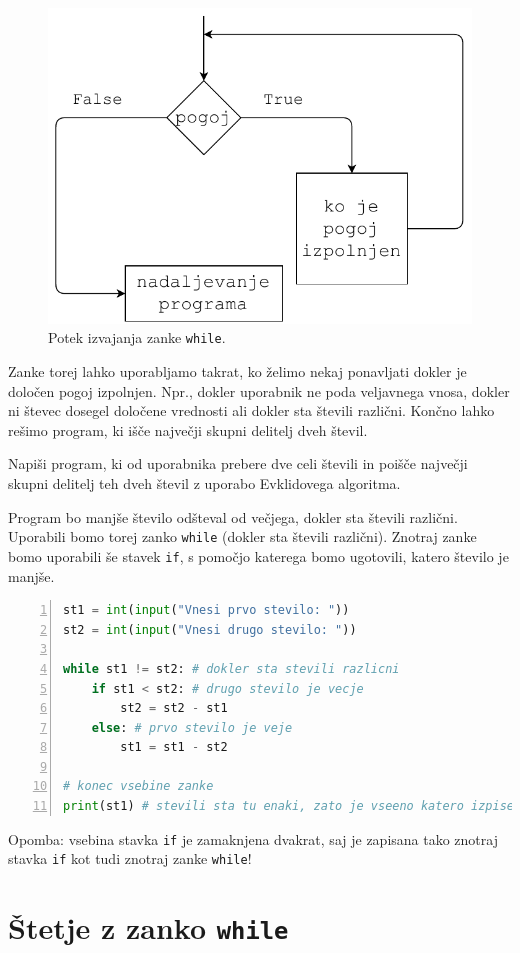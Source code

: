 \begin{figure}
    \centering
    \includegraphics[width=0.5\linewidth]{img/while1.pdf}
    \caption{Potek izvajanja zanke \texttt{while}.}
    \label{img:while1}
\end{figure}

Zanke torej lahko uporabljamo takrat, ko želimo nekaj ponavljati dokler je določen pogoj izpolnjen. Npr., dokler uporabnik ne poda veljavnega vnosa, dokler ni števec dosegel določene vrednosti ali dokler sta števili različni. Končno lahko rešimo program, ki išče največji skupni delitelj dveh števil.
\begin{zgled}
Napiši program, ki od uporabnika prebere dve celi števili in poišče največji skupni delitelj teh dveh števil z uporabo Evklidovega algoritma.
\end{zgled}
\begin{resitev}
Program bo manjše število odšteval od večjega, dokler sta števili različni. Uporabili bomo torej zanko \texttt{while} (dokler sta števili različni).  Znotraj zanke bomo uporabili še stavek \texttt{if}, s pomočjo katerega bomo ugotovili, katero število je manjše. 
\begin{lstlisting}[language=Python,numbers=left]
st1 = int(input("Vnesi prvo stevilo: "))
st2 = int(input("Vnesi drugo stevilo: "))

while st1 != st2: # dokler sta stevili razlicni
    if st1 < st2: # drugo stevilo je vecje
        st2 = st2 - st1
    else: # prvo stevilo je veje
        st1 = st1 - st2

# konec vsebine zanke 
print(st1) # stevili sta tu enaki, zato je vseeno katero izpisem
\end{lstlisting}
Opomba: vsebina stavka \texttt{if} je zamaknjena dvakrat, saj je zapisana tako znotraj stavka \texttt{if} kot tudi znotraj zanke \texttt{while}!
\end{resitev}

\section{Štetje z zanko \texttt{while}}

